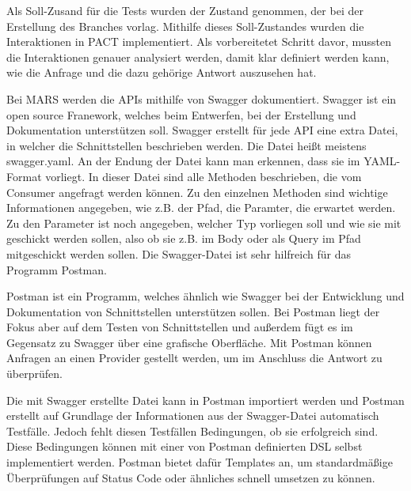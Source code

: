 \documentclass{llncs}
\begin{document}
Als Soll-Zusand für die Tests wurden der Zustand genommen, der bei der Erstellung des Branches vorlag. Mithilfe dieses Soll-Zustandes wurden die Interaktionen in PACT implementiert. Als vorbereitetet Schritt davor, mussten die Interaktionen genauer analysiert werden, damit klar definiert werden kann, wie die Anfrage und die dazu gehörige Antwort auszusehen hat.

Bei MARS werden die APIs mithilfe von Swagger\citep{swagger} dokumentiert. Swagger ist ein open source Franework, welches beim Entwerfen, bei der Erstellung und Dokumentation unterstützen soll. Swagger erstellt für jede API eine extra Datei, in welcher die Schnittstellen beschrieben werden. Die Datei heißt meistens swagger.yaml. An der Endung der Datei kann man erkennen, dass sie im YAML-Format vorliegt. In dieser Datei sind alle Methoden beschrieben, die vom Consumer angefragt werden können. Zu den einzelnen Methoden sind wichtige Informationen angegeben, wie z.B. der Pfad, die Paramter, die erwartet werden. Zu den Parameter ist noch angegeben, welcher Typ vorliegen soll und wie sie mit geschickt werden sollen, also ob sie z.B. im Body oder als Query im Pfad mitgeschickt werden sollen. Die Swagger-Datei ist sehr hilfreich für das Programm Postman.

Postman \cite{postman} ist ein Programm, welches ähnlich wie Swagger bei der Entwicklung und Dokumentation von Schnittstellen unterstützen sollen. Bei Postman liegt der Fokus aber auf dem Testen von Schnittstellen und außerdem fügt es im Gegensatz zu Swagger über eine grafische Oberfläche. Mit Postman können Anfragen an einen Provider gestellt werden, um im Anschluss die Antwort zu überprüfen. 

Die mit Swagger erstellte Datei kann in Postman importiert werden und Postman erstellt auf Grundlage der Informationen aus der Swagger-Datei automatisch Testfälle. Jedoch fehlt diesen Testfällen Bedingungen, ob sie erfolgreich sind. Diese Bedingungen können mit einer von Postman definierten DSL selbst implementiert werden. Postman bietet dafür Templates an, um standardmäßige Überprüfungen auf Status Code oder ähnliches schnell umsetzen zu können.
\end{document}
